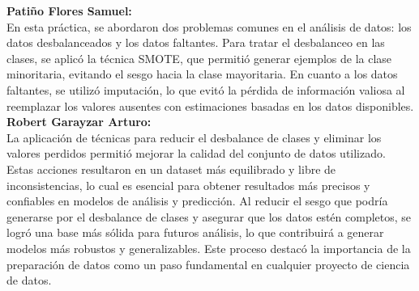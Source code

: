 \documentclass{article}
\begin{document}
    \textbf{\Large Patiño Flores Samuel:} \\
    
    En esta práctica, se abordaron dos problemas comunes en el análisis de datos: los datos desbalanceados y los datos faltantes. Para tratar el desbalanceo en las clases, se aplicó la técnica SMOTE, que permitió generar ejemplos de la clase minoritaria, evitando el sesgo hacia la clase mayoritaria. En cuanto a los datos faltantes, se utilizó imputación, lo que evitó la pérdida de información valiosa al reemplazar los valores ausentes con estimaciones basadas en los datos disponibles. \\
    
    \textbf{\Large Robert Garayzar Arturo:} \\
    
    La aplicación de técnicas para reducir el desbalance de clases y eliminar los valores perdidos permitió mejorar la calidad del conjunto de datos utilizado. Estas acciones resultaron en un dataset más equilibrado y libre de inconsistencias, lo cual es esencial para obtener resultados más precisos y confiables en modelos de análisis y predicción. Al reducir el sesgo que podría generarse por el desbalance de clases y asegurar que los datos estén completos, se logró una base más sólida para futuros análisis, lo que contribuirá a generar modelos más robustos y generalizables. Este proceso destacó la importancia de la preparación de datos como un paso fundamental en cualquier proyecto de ciencia de datos. \\
    
    
\end{document}

